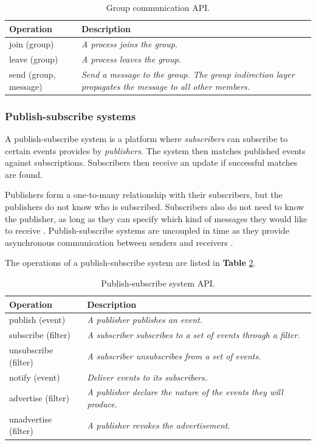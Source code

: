 \begin{table}
	\caption{Group communication API.}
	\label{tab:api:groupcommunication}
	\begin{tabular}{p{150px} | p{250px}}
		\textbf{Operation} & \textbf{Description} \\
		\hline
		join (group) & \emph{A process joins the group.} \\
		leave (group) & \emph{A process leaves the group.} \\
		send (group, message) & \emph{Send a message to the group. The group indirection layer propagates the message to all other members.} \\
		\hline
	\end{tabular}
\end{table}


\subsubsection{Publish-subscribe systems}

A publish-subscribe system is a platform where \emph{subscribers} can subscribe to certain events provides by \emph{publishers}. The system then matches published events against subscriptions. Subscribers then receive an update if successful matches are found.

Publishers form a one-to-many relationship with their subscribers, but the publishers do not know who is subscribed. Subscribers also do not need to know the publisher, as long as they can specify which kind of messages they would like to receive . Publish-subscribe systems are uncoupled in time as they provide asynchronous communication between senders and receivers \cite{Coulouris:2011:DSC:2029110}.

The operations of a publish-subscribe system are listed in \textbf{Table} \ref{tab:api:publishsubscribersystems}.


\begin{table}[h]
	\caption{Publish-subscribe system API.}
	\label{tab:api:publishsubscribersystems}
	\begin{tabular}{p{150px} | p{250px}}
		\textbf{Operation} & \textbf{Description} \\
		\hline
		publish (event) 			& \emph{A publisher publishes an event.} \\
		subscribe (filter) 		& \emph{A subscriber subscribes to a set of events through a filter.} \\
		unsubscribe (filter) 	& \emph{A subscriber unsubscribes from a set of events.} \\
		notify (event) 				& \emph{Deliver events to its subscribers.} \\
	  advertise (filter) 		& \emph{A publisher declare the nature of the events they will produce.} \\
		unadvertise (filter) 	& \emph{A publisher revokes the advertisement.} \\
		\hline
	\end{tabular}
\end{table}



